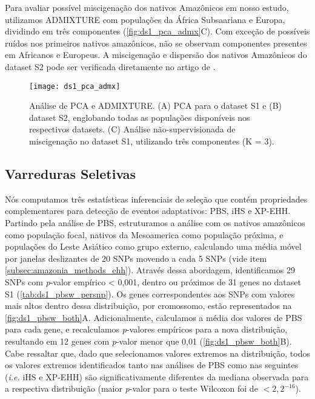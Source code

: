 Para avaliar possível miscigenação dos nativos Amazônicos em nosso estudo, utilizamos ADMIXTURE com populações da África Subsaariana e Europa, dividindo em três componentes (\autoref{fig:ds1_pca_admx}C). Com exceção de possíveis ruídos nos primeiros nativos amazônicos, não se observam componentes presentes em Africanos e Europeus. A miscigenação e dispersão dos nativos Amazônicos do dataset S2 pode ser verificada diretamente no artigo de .

\begin{figure}[!htb]  %
\noindent
\centering
\texttt{[image: ds1\_pca\_admx]}
\caption[Análise de PCA e ADMIXTURE.]{Análise de PCA e ADMIXTURE. (A) PCA para o dataset S1 e (B) dataset S2, englobando todas as populações disponíveis nos respectivos datasets. (C) Análise não-supervisionada de miscigenação no dataset S1, utilizando três componentes (K = 3).}
\label{fig:ds1_pca_admx}
\end{figure}

\subsection{Varreduras Seletivas}

Nós computamos três estatísticas inferenciais de seleção que contém propriedades complementares para detecção de eventos adaptativos: PBS, iHS e XP-EHH. Partindo pela análise de PBS, estruturamos a análise com os nativos amazônicos como população focal, nativos da Mesoamerica como população próxima, e populações do Leste Asiático como grupo externo, calculando uma média móvel por janelas deslizantes de 20 SNPs movendo a cada 5 SNPs (vide item \ref{subsec:amazonia_methods_ehh}). Através dessa abordagem, identificamos 29 SNPs com \emph{p}-valor empírico < 0,001, dentro ou próximos de 31 genes no dataset S1 (\autoref{tab:ds1_pbsw_persnp}). Os genes correspondentes aos SNPs com valores mais altos dentro dessa distribuição, por cromossomo, estão representados na \autoref{fig:ds1_pbsw_both}A. Adicionalmente, calculamos a média dos valores de PBS para cada gene, e recalculamos \emph{p}-valores empíricos para a nova distribuição, resultando em 12 genes com \emph{p}-valor menor que 0,01 (\autoref{fig:ds1_pbsw_both}B). Cabe ressaltar que, dado que selecionamos valores extremos na distribuição, todos os valores extremos identificados tanto nas análises de PBS como nas seguintes (\emph{i.e.} iHS e XP-EHH) são significativamente diferentes da mediana observada para a respectiva distribuição (maior \emph{p}-valor para o teste Wilcoxon foi de $< 2,2^{-16}$).

